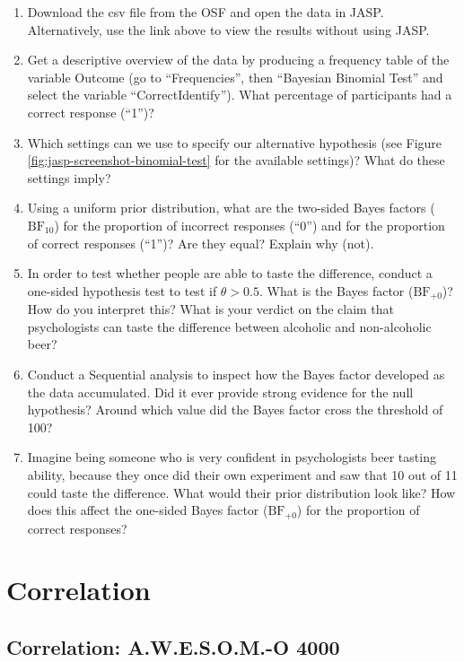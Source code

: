 \documentclass[
]{book}
\providecommand{\tightlist}{%
  \setlength{\itemsep}{0pt}\setlength{\parskip}{0pt}}
\begin{document}
\begin{enumerate}
\def\labelenumi{\arabic{enumi}.}
\tightlist
\item
  Download the csv file from the OSF and open the data in JASP. Alternatively, use the link above to view the results without using JASP.
\item
  Get a descriptive overview of the data by producing a frequency table of the variable Outcome (go to ``Frequencies'', then ``Bayesian Binomial Test'' and select the variable ``CorrectIdentify''). What percentage of participants had a correct response (``1'')?
\item
  Which settings can we use to specify our alternative hypothesis (see Figure \ref{fig:jasp-screenshot-binomial-test} for the available settings)? What do these settings imply?
\item
  Using a uniform prior distribution, what are the two-sided Bayes factors (\(\text{BF}_{10}\)) for the proportion of incorrect responses (``0'') and for the proportion of correct responses (``1'')? Are they equal? Explain why (not).
\item
  In order to test whether people are able to taste the difference, conduct a one-sided hypothesis test to test if \(\theta > 0.5\). What is the Bayes factor (\(\text{BF}_{+0}\))? How do you interpret this? What is your verdict on the claim that psychologists can taste the difference between alcoholic and non-alcoholic beer?
\item
  Conduct a Sequential analysis to inspect how the Bayes factor developed as the data accumulated. Did it ever provide strong evidence for the null hypothesis? Around which value did the Bayes factor cross the threshold of 100?
\item
  Imagine being someone who is very confident in psychologists beer tasting ability, because they once did their own experiment and saw that 10 out of 11 could taste the difference. What would their prior distribution look like? How does this affect the one-sided Bayes factor (\(\text{BF}_{+0}\)) for the proportion of correct responses?
\end{enumerate}

\hypertarget{correlation}{%
\section{Correlation}\label{correlation}}

\hypertarget{correlation-a.w.e.s.o.m.-o-4000}{%
\subsection{Correlation: A.W.E.S.O.M.-O 4000}\label{correlation-a.w.e.s.o.m.-o-4000}}
\end{document}
